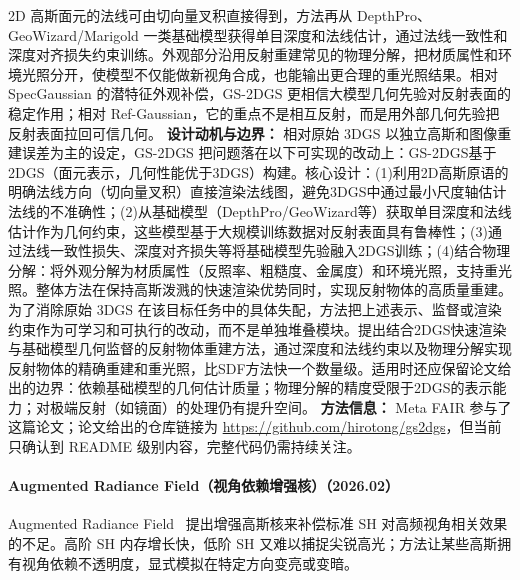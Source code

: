 2D 高斯面元的法线可由切向量叉积直接得到，方法再从 DepthPro、GeoWizard/Marigold 一类基础模型获得单目深度和法线估计，通过法线一致性和深度对齐损失约束训练。外观部分沿用反射重建常见的物理分解，把材质属性和环境光照分开，使模型不仅能做新视角合成，也能输出更合理的重光照结果。相对 SpecGaussian 的潜特征外观补偿，GS-2DGS 更相信大模型几何先验对反射表面的稳定作用；相对 Ref-Gaussian，它的重点不是相互反射，而是用外部几何先验把反射表面拉回可信几何。
\textbf{设计动机与边界：} 相对原始 3DGS 以独立高斯和图像重建误差为主的设定，GS-2DGS 把问题落在以下可实现的改动上：GS-2DGS基于2DGS（面元表示，几何性能优于3DGS）构建。核心设计：(1)利用2D高斯原语的明确法线方向（切向量叉积）直接渲染法线图，避免3DGS中通过最小尺度轴估计法线的不准确性；(2)从基础模型（DepthPro/GeoWizard等）获取单目深度和法线估计作为几何约束，这些模型基于大规模训练数据对反射表面具有鲁棒性；(3)通过法线一致性损失、深度对齐损失等将基础模型先验融入2DGS训练；(4)结合物理分解：将外观分解为材质属性（反照率、粗糙度、金属度）和环境光照，支持重光照。整体方法在保持高斯泼溅的快速渲染优势同时，实现反射物体的高质量重建。为了消除原始 3DGS 在该目标任务中的具体失配，方法把上述表示、监督或渲染约束作为可学习和可执行的改动，而不是单独堆叠模块。提出结合2DGS快速渲染与基础模型几何监督的反射物体重建方法，通过深度和法线约束以及物理分解实现反射物体的精确重建和重光照，比SDF方法快一个数量级。适用时还应保留论文给出的边界：依赖基础模型的几何估计质量；物理分解的精度受限于2DGS的表示能力；对极端反射（如镜面）的处理仍有提升空间。
\textbf{方法信息：} Meta FAIR 参与了这篇论文；论文给出的仓库链接为 \url{https://github.com/hirotong/gs2dgs}，但当前只确认到 README 级别内容，完整代码仍需持续关注。



\paragraph{Augmented Radiance Field（视角依赖增强核）（2026.02）}
Augmented Radiance Field~\cite{2602_19916} 提出增强高斯核来补偿标准 SH 对高频视角相关效果的不足。高阶 SH 内存增长快，低阶 SH 又难以捕捉尖锐高光；方法让某些高斯拥有视角依赖不透明度，显式模拟在特定方向变亮或变暗。

